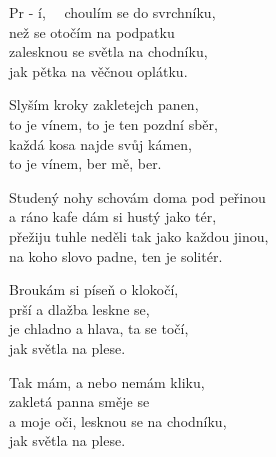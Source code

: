 
\ve{}
Pr - í, \ \ choulím se do svrchníku,\\
než se otočím na podpatku\\
zalesknou se světla na chodníku,\\
jak pětka na věčnou oplátku.

\ve{}
Slyším kroky zakletejch panen,\\
to je vínem, to je ten pozdní sběr,\\
každá kosa najde svůj kámen,\\
to je vínem, ber mě, ber.

\cho{}
Studený nohy schovám doma pod peřinou\\
a ráno kafe dám si hustý jako tér,\\
přežiju tuhle neděli tak jako každou jinou,\\
na koho slovo padne, ten je solitér.

\ve{}
Broukám si píseň o klokočí,\\
prší a dlažba leskne se,\\
je chladno a hlava, ta se točí,\\
jak světla na plese.

\cho{}

\ve{}
Tak mám, a nebo nemám kliku,\\
zakletá panna směje se\\
a moje oči, lesknou se na chodníku,\\
jak světla na plese. 

\cho{}

\esong